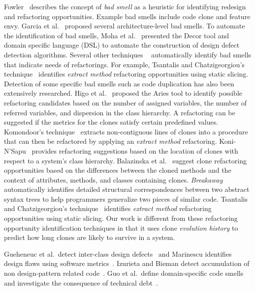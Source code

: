 \documentclass[runningheads,a4paper]{llncs}
\begin{document}
Fowler~\cite{1999:RID} describes the concept of {\em bad smell} as a heuristic for identifying redesign and refactoring opportunities. Example bad smells include code clone and feature envy. Garcia et al.~\cite{Garcia2009:badsmell} proposed several architecture-level bad smells. To automate the identification of bad smells, Moha et al.~\cite{Moha2009:designdefect} presented the Decor tool and domain specific language (DSL) to automate the construction of design defect detection algorithms.  Several other techniques ~\cite{Tsantalis2009:extractmethod,Tsantalis2009:movemethod,Tsantalis2008:jdeodorant} automatically identify bad smells that indicate needs of refactorings. For example, Tsantalis and Chatzigeorgiou's technique~\cite{Tsantalis2009:extractmethod} identifies {\em extract method} refactoring opportunities using static slicing. Detection of some specific bad smells such as code duplication has also been extensively researched. Higo et al.~\cite{Higo2004} proposed the Aries tool to identify possible refactoring candidates based on the number of assigned variables, the number of referred variables, and dispersion in the class hierarchy. A refactoring can be suggested if the metrics for the clones satisfy certain predefined values. Komondoor's technique~\cite{Komondoor2003} extracts non-contiguous lines of clones into a procedure that can then be refactored by applying an {\em extract method} refactoring. Koni-N'Sapu~\cite{koni_nsapu:ms01} provides refactoring suggestions based on the location of clones with respect to a system's class hierarchy. Balazinska et al.~\cite{Balazinska2000:ACA} suggest clone refactoring opportunities based on the differences between the cloned methods and the context of attributes, methods, and classes containing clones. {\it Breakaway} \cite{Cottrell:2007} automatically identifies detailed structural correspondences between two abstract syntax trees to help programmers generalize two pieces of similar code. Tsantalis and Chatzigeorgiou's technique~\cite{Tsantalis2009:extractmethod,Tsantalis2008:jdeodorant} identifies {\em extract method} refactoring opportunities using static slicing. Our work is different from these refactoring opportunity identification techniques in that it uses clone {\em evolution history} to predict how long clones are likely to survive in a system. 

Gueheneuc et al.~detect inter-class design defects~\cite{Gueheneuc2001:designdefect} and Marinescu identifies design flaws using software metrics~\cite{Marinescu2004:designflaw}. Izurieta and Bieman detect accumulation of non design-pattern related code~\cite{Izurieta2007:grime}. Guo et al.~define domain-specific code smells~\cite{Guo2010:smell} and investigate the consequence of technical debt~\cite{Guo2011:td}.
\end{document}
